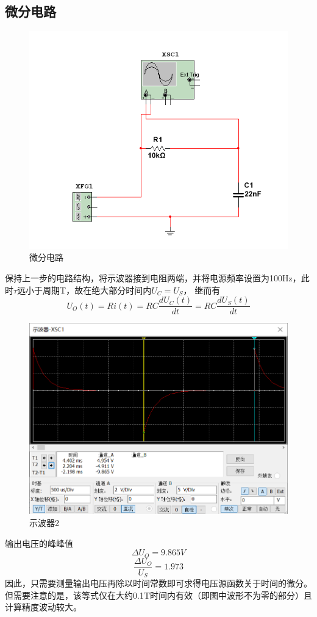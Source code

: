 \documentclass{ctexart}
\begin{document}
\subsection{微分电路}
\begin{figure}
    \centering
    \includegraphics{pic/微分电路.png}
    \caption{微分电路}
    \label{fig:微分电路}
\end{figure}
保持上一步的电路结构，将示波器接到电阻两端，并将电源频率设置为100Hz，此时$\tau$远小于周期T，故在绝大部分时间内$U_C=U_S$，
继而有
\begin{equation}
    U_O(t)=Ri(t)=RC\dfrac{dU_C(t)}{dt}=RC\dfrac{dU_S(t)}{dt}
\end{equation}
\begin{figure}
    \centering
    \includegraphics{pic/示波器2.png}
    \caption{示波器2}
    \label{fig:示波器2}
\end{figure}
输出电压的峰峰值
\begin{equation}
    \Delta U_O = 9.865V 
\end{equation}
\begin{equation}
    \dfrac{\Delta U_O}{U_S}=1.973
\end{equation}
因此，只需要测量输出电压再除以时间常数即可求得电压源函数关于时间的微分。但需要注意的是，该等式仅在大约0.1T时间内有效（即图中波形不为零的部分）且计算精度波动较大。
\end{document}
